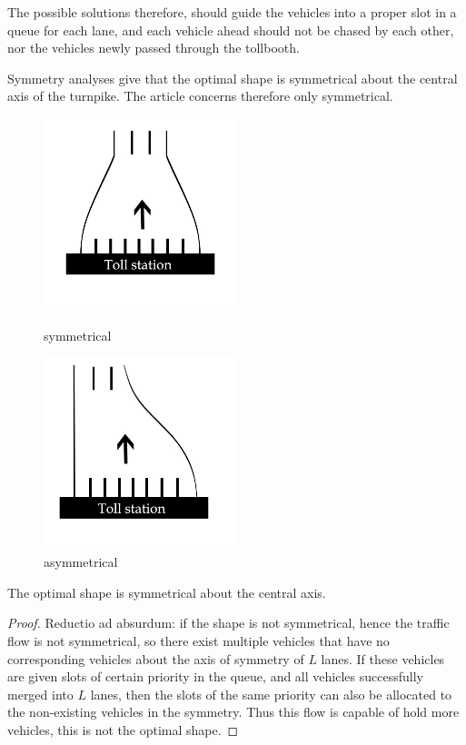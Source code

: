 \documentclass{mcmthesis}
\begin{document}
The possible solutions therefore, should guide the vehicles into a proper slot in a queue for each lane, and each vehicle ahead should not be chased by each other, nor the vehicles newly passed through the tollbooth.

Symmetry analyses give that the optimal shape is symmetrical about the central axis of the turnpike. The article concerns therefore only symmetrical.
\begin{figure}
	\begin{minipage}[t]{0.5\linewidth}
		\centering
		\includegraphics[width=2.2in]{symmetrical.jpg}
		\caption{symmetrical}
		\label{symmetrical}
	\end{minipage}%
	\begin{minipage}[t]{0.5\linewidth}
		\centering
		\includegraphics[width=2.2in]{asymmetrical.jpg}
		\caption{asymmetrical}
		\label{asymmetrical}
	\end{minipage}
\end{figure}


\begin{Theorem} \label{thm:yingsongsheng}
The optimal shape is symmetrical about the central axis.
\end{Theorem}

\begin{proof}
Reductio ad absurdum: if the shape is not symmetrical, hence the traffic flow is not symmetrical, so there exist multiple vehicles that have no corresponding vehicles about the axis of symmetry of $L$ lanes. If these vehicles are given slots of certain priority in the queue, and all vehicles successfully merged into $L$ lanes, then the slots of the same priority can also be allocated to the non-existing vehicles in the symmetry. Thus this flow is capable of hold more vehicles, this is not the optimal shape.
\end{proof}
\end{document}
